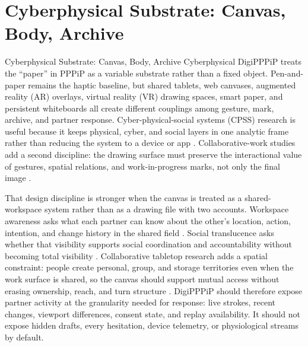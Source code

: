 \documentclass[
  ignorenonframetext,
]{beamer}
\author{\texorpdfstring{}{}}
\date{}
\begin{document}
\section{Cyberphysical Substrate: Canvas, Body,
Archive}\label{sec:cyberphysical}

\begin{frame}{Cyberphysical Substrate: Canvas,
Body, Archive}
Cyberphysical DigiPPPiP treats the ``paper'' in PPPiP as a variable
substrate rather than a fixed object. Pen-and-paper remains the haptic
baseline, but shared tablets, web canvases, augmented reality (AR)
overlays, virtual reality (VR) drawing spaces, smart paper, and
persistent whiteboards all create different couplings among gesture,
mark, archive, and partner response. Cyber-physical-social systems
(CPSS) research is useful because it keeps physical, cyber, and social
layers in one analytic frame rather than reducing the system to a device
or app . Collaborative-work studies add a second
discipline: the drawing surface must preserve the interactional value of
gestures, spatial relations, and work-in-progress marks, not only the
final image .

That design discipline is stronger when the canvas is treated as a
shared-workspace system rather than as a drawing file with two accounts.
Workspace awareness asks what each partner can know about the other's
location, action, intention, and change history in the shared field
. Social translucence asks whether
that visibility supports social coordination and accountability without
becoming total visibility .
Collaborative tabletop research adds a spatial constraint: people create
personal, group, and storage territories even when the work surface is
shared, so the canvas should support mutual access without erasing
ownership, reach, and turn structure .
DigiPPPiP should therefore expose partner activity at the granularity
needed for response: live strokes, recent changes, viewport differences,
consent state, and replay availability. It should not expose hidden
drafts, every hesitation, device telemetry, or physiological streams by
default.


\end{frame}
\end{document}
